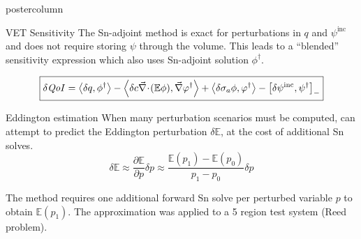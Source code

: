 \documentclass[xcolor={usenames,dvipsnames,svgnames,table}]{beamer}
\newcommand{\bra}{\left\langle}
\newcommand{\ket}{\right\rangle}
\newcommand{\sbra}{\left[}
\newcommand{\sket}{\right]}
\newcommand{\Edd}{\mathbb{E}}
\newcommand{\isigt}{c}
\newcommand{\qoi}{{\it QoI}\xspace}
\begin{document}
\begin{frame}
\begin{columns}
\begin{column}{.33\textwidth}
\begin{beamercolorbox}[center,wd=\textwidth]{postercolumn}
\begin{minipage}[T]{0.95\textwidth}
{\begin{block}{VET Sensitivity}
The Sn-adjoint method is exact for perturbations in $q$ and $\psi^\text{inc}$ and does not require storing $\psi$ through the volume. This leads to a ``blended'' sensitivity expression which also uses Sn-adjoint solution $\phi^\dag$.

\begin{equation}
\label{SensIP2}
\boxed{
\delta \qoi =  \bra \delta q , \phi^\dag \ket - \bra \delta \isigt \div (\Edd \phi), \grad \varphi^\dag \ket + \bra \delta \sigma_a \phi, \varphi^\dag \ket - \sbra \delta \psi^{\text{inc}}, \psi^\dag \sket_- 
}
\end{equation}


			    \end{block}
			    \vfill
			    \begin{block}{Eddington estimation}
			    When many perturbation scenarios must be computed, can attempt to predict the Eddington perturbation $\delta \Edd$, at the cost of additional Sn solves. 
\begin{equation}
	\delta \Edd \approx \frac{\partial \Edd}{\partial p} \delta p \approx \frac{\Edd(p_1) - \Edd(p_0)}{p_1 - p_0} \delta p	     
\end{equation}

The method requires one additional forward Sn solve per perturbed variable $p$ to obtain $\Edd(p_1)$.	
The approximation was applied to a 5 region test system (Reed problem).


\end{block}}
\end{minipage}
\end{beamercolorbox}
\end{column}
\end{columns}
\end{frame}
\end{document}
